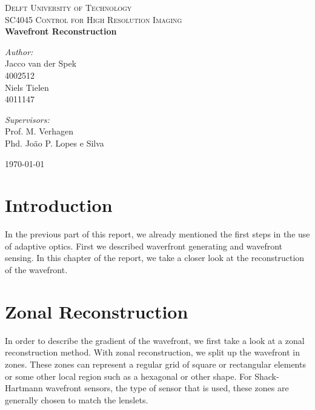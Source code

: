 \documentclass{article}
\begin{document}
\begin{titlepage}
\begin{center}

\textsc{\LARGE Delft University of Technology}\\[1.5cm]
\textsc{ SC4045 Control for High Resolution Imaging}\\[0.5cm]

{\huge\bfseries Wavefront Reconstruction \\[0.4cm] }

\begin{minipage}{0.4\textwidth}
\begin{flushleft} \large
\emph{Author:}\\
Jacco van der Spek \\
4002512 \\
Niels Tielen \\
4011147

\end{flushleft}
\end{minipage}
\begin{minipage}{0.4\textwidth}
\begin{flushright} \large
\emph{Supervisors:} \\
Prof. M. Verhagen \\
Phd. João P. Lopes e Silva  
\end{flushright}
\end{minipage}

\vfill
{\large \today}
\end{center}
\end{titlepage}

\section*{Introduction}

In the previous part of this report, we already mentioned the first steps in the use of adaptive optics. First we described waverfront generating and wavefront sensing. In this chapter of the report, we take a closer look at the reconstruction of the wavefront. 

\section{Zonal Reconstruction}
In order to describe the gradient of the wavefront, we first take a look at a zonal reconstruction method. With zonal reconstruction, we split up the wavefront in zones. These zones can represent a regular grid of square or rectangular elements or some other local region such as a hexagonal or other shape. For Shack-Hartmann wavefront sensors, the type of sensor that is used, these zones are generally chosen to match the lenslets.
\end{document}
